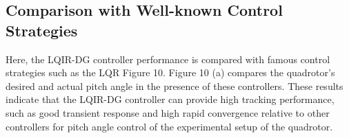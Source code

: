 \documentclass[conference]{IEEEtran}
\begin{document}
\subsection{Comparison with Well-known Control Strategies}
Here, the LQIR-DG controller performance is compared with famous control strategies such as the LQR Figure 10. Figure 10 (a) compares the quadrotor's desired and actual pitch angle in the presence of these controllers. These results indicate that the LQIR-DG controller can provide high tracking performance, such as good transient response and high rapid convergence relative to other controllers for pitch angle control of the experimental setup of the quadrotor.

\begin{figure}[!h]
	\centering
	\hfil
\end{figure}
\end{document}

